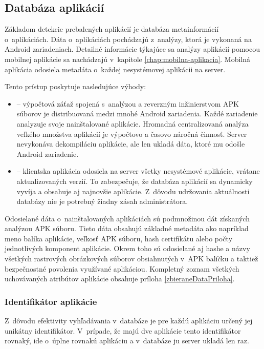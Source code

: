 \subsection{Databáza aplikácií}

Základom detekcie prebalených aplikácií je databáza metainformácií o~aplikáciách. Dáta o~aplikáciách pochádzajú z~analýzy, ktorá je vykonaná na Android zariadeniach. Detailné informácie týkajúce sa analýzy aplikácií pomocou mobilnej aplikácie  sa nachádzajú v~kapitole \ref{chap:mobilna-aplikacia}. Mobilná aplikácia odosiela metadáta o~každej nesystémovej aplikácii na server.

 
\noindent Tento prístup poskytuje nasledujúce výhody:
\begin{itemize}
	\item {} -- výpočtová záťaž spojená s~analýzou a reverzným inžinierstvom APK súborov je distribuovaná medzi mnohé Android zariadenia. Každé zariadenie analyzuje svoje nainštalované aplikácie. Hromadná centralizovaná analýza veľkého množstva aplikácií je výpočtovo a časovo náročná činnosť. Server nevykonáva dekompiláciu aplikácie, ale len ukladá dáta, ktoré mu odošle Android zariadenie.
	\item {} -- klientska aplikácia odosiela na server všetky nesystémové aplikácie, vrátane aktualizovaných verzií. To zabezpečuje, že databáza aplikácií sa dynamicky vyvíja a obsahuje aj najnovšie aplikácie. Z~dôvodu udržovania aktuálnosti databázy nie je potrebný žiadny zásah administrátora.
\end{itemize}

\noindent Odosielané dáta o~nainštalovaných aplikáciách sú podmnožinou dát získaných analýzou APK súboru. Tieto dáta obsahujú základné metadáta ako napríklad meno balíka aplikácie, veľkosť APK súboru, hash certifikátu alebo počty jednotlivých komponent aplikácie. Okrem toho sú odosielané aj hashe a názvy všetkých rastrových obrázkových súborov obsiahnutých v~APK balíčku a taktiež bezpečnostné povolenia využívané aplikáciou. Kompletný zoznam všetkých uchovávaných atribútov aplikácie obsahuje príloha \ref{zbieraneDataPriloha}.

\subsubsection{\textbf{Identifikátor aplikácie}} 

Z~dôvodu efektivity vyhľadávania v~databáze je pre každú aplikáciu určený jej unikátny identifikátor. V~prípade, že majú dve aplikácie tento identifikátor rovnaký, ide o~úplne rovnakú aplikáciu a v~databáze ju server ukladá len raz.


